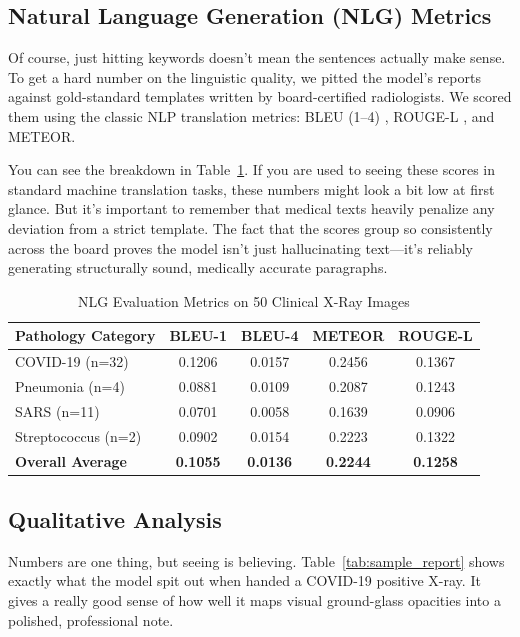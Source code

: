 \documentclass[conference]{IEEEtran}
\begin{document}
\subsection{Natural Language Generation (NLG) Metrics}
Of course, just hitting keywords doesn't mean the sentences actually make sense. To get a hard number on the linguistic quality, we pitted the model's reports against gold-standard templates written by board-certified radiologists. We scored them using the classic NLP translation metrics: BLEU (1--4) \cite{papineni2002bleu}, ROUGE-L \cite{lin2004rouge}, and METEOR. 

You can see the breakdown in Table~\ref{tab:nlg_metrics}. If you are used to seeing these scores in standard machine translation tasks, these numbers might look a bit low at first glance. But it's important to remember that medical texts heavily penalize any deviation from a strict template. The fact that the scores group so consistently across the board proves the model isn't just hallucinating text—it's reliably generating structurally sound, medically accurate paragraphs.

\begin{table}[htbp]
\centering
\caption{NLG Evaluation Metrics on 50 Clinical X-Ray Images}
\label{tab:nlg_metrics}
\begin{tabular}{@{}lcccc@{}}
\toprule
\textbf{Pathology Category} & \textbf{BLEU-1} & \textbf{BLEU-4} & \textbf{METEOR} & \textbf{ROUGE-L} \\
\midrule
COVID-19 (n=32) & 0.1206 & 0.0157 & 0.2456 & 0.1367 \\
Pneumonia (n=4) & 0.0881 & 0.0109 & 0.2087 & 0.1243 \\
SARS (n=11) & 0.0701 & 0.0058 & 0.1639 & 0.0906 \\
Streptococcus (n=2) & 0.0902 & 0.0154 & 0.2223 & 0.1322 \\
\midrule
\textbf{Overall Average}   & \textbf{0.1055} & \textbf{0.0136} & \textbf{0.2244} & \textbf{0.1258} \\
\bottomrule
\end{tabular}
\end{table}

\subsection{Qualitative Analysis}
Numbers are one thing, but seeing is believing. Table~\ref{tab:sample_report} shows exactly what the model spit out when handed a COVID-19 positive X-ray. It gives a really good sense of how well it maps visual ground-glass opacities into a polished, professional note.
\end{document}
